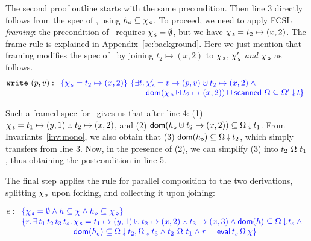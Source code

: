 The second proof outline starts with the same precondition. Then line
$3$ directly follows from the spec of \jywrite, using $h_o
\subseteq \chi_{\, \mathsf{o}}$. To proceed, we need to apply FCSL
\emph{framing}: the precondition of \jywrite\ requires $\chi_{\, \mathsf{s}} =
\emptyset$, but we have $\chi_{\, \mathsf{s}} = t_2 \mapsto (x, 2)$.
The frame rule is explained in Appendix~\ref{sc:background}.
%
Here we just mention that framing modifies the spec of \jywrite\ by
joining $t_2 \mapsto (x, 2)$ to $\chi_{\, \mathsf{s}}$, $\chi_{\, \mathsf{s}}'$ \emph{and}
$\chi_{\, \mathsf{o}}$ as follows.
\[
\mathtt{write}\ (p, v) : 
\begin{array}[t]{l}
\tsPre{\{\histS = t_2 \mapsto (x, 2)\}}\
\tsPos{\{\exists t\ldot \histS' = t \mapsto (p, v) \hunion t_2 \mapsto (x, 2) \wedge \hbox{}}\\
\tsPos{\hphantom{\{\histS = t_2 \mapsto (x, 2)\}\ \{\exists t\ldot}
    \dom {\histO \hunion t_2 \mapsto (x, 2)} \cup \scanned\, \stableorder
       \subseteq \sideal{\stableorderP}{t}\}}
\end{array}
\]

Such a framed spec for \jywrite\ gives us that after line 4: (1)
$\histS = t_1 \hpts (y,1) \hunion t_2 \hpts (x,2)$, and (2)
$\dom{h_{\othersub} \hunion t_2 \mapsto (x, 2)} \subseteq
\sideal{\stableorder}{t_1}$. From Invariants~\ref{inv:mono}, we also
obtain that (3) $\dom{h_{\othersub}} \subseteq
\sideal{\stableorder}{t_2}$, which simply transfers from line 3. Now,
in the presence of (2), we can simplify (3) into
$t_2\ {\Omega}\ t_1$, thus obtaining the postcondition in line
5.

The final step applies the rule for parallel composition to the two
derivations, splitting $\chi_{\, \mathsf{s}}$ upon forking, and collecting it upon
joining:
%

\[
e : \begin{array}[t]{l}
    \specK{\{\histS = \hempty \wedge h \subseteq \hist \wedge h_o \subseteq \histO\}}\\
 \specK{\{r\ldot \exists\, t_1\, t_2\, t_3\, t_s \ldot 
    \histS = t_1 \hpts (y,1) \hunion t_2 \hpts (x,2) \hunion t_3 \hpts
        (x, 3) \wedge  \dom{h} \subseteq \ideal{\stableorder}{t_s} \wedge \hbox{}}\\
\specK{\hphantom{\{r\ldot \exists\, t_1\, t_2\, t_3\, t_s \ldot }
\dom{h_{\othersub}} \subseteq \sideal{\stableorder}{t_2}, \sideal{\stableorder}{t_3} \wedge 
 t_2\ {\stableorder}\ t_1 \wedge 
     r = \eval\, t_s\, \stableorder\, \hist\}}
\end{array}
\]

